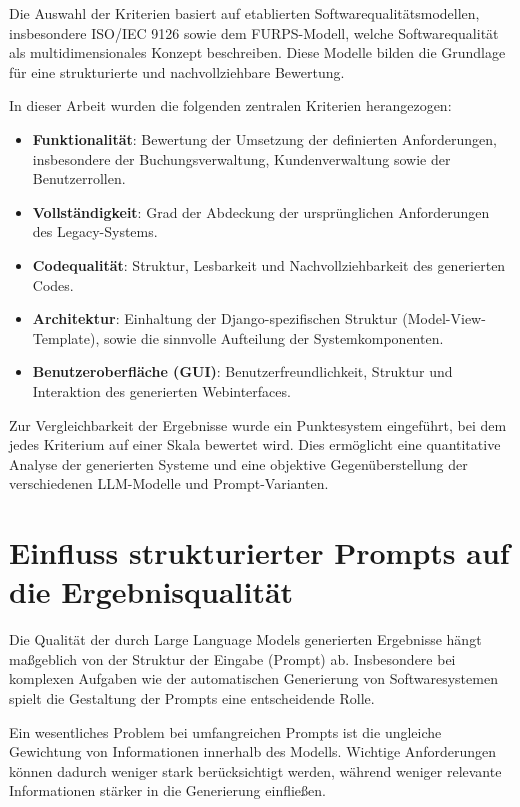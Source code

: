 Die Auswahl der Kriterien basiert auf etablierten
Softwarequalitätsmodellen, insbesondere ISO/IEC 9126 sowie
dem FURPS-Modell, welche Softwarequalität als
multidimensionales Konzept beschreiben. Diese Modelle
bilden die Grundlage für eine strukturierte und
nachvollziehbare Bewertung.

In dieser Arbeit wurden die folgenden zentralen Kriterien
herangezogen:

\begin{itemize}
    \item \textbf{Funktionalität}: Bewertung der Umsetzung
    der definierten Anforderungen, insbesondere der
    Buchungsverwaltung, Kundenverwaltung sowie der
    Benutzerrollen.

    \item \textbf{Vollständigkeit}: Grad der Abdeckung der
    ursprünglichen Anforderungen des Legacy-Systems.

    \item \textbf{Codequalität}: Struktur, Lesbarkeit und
    Nachvollziehbarkeit des generierten Codes.

    \item \textbf{Architektur}: Einhaltung der
    Django-spezifischen Struktur (Model-View-Template),
    sowie die sinnvolle Aufteilung der Systemkomponenten.

    \item \textbf{Benutzeroberfläche (GUI)}:
    Benutzerfreundlichkeit, Struktur und Interaktion
    des generierten Webinterfaces.
\end{itemize}

Zur Vergleichbarkeit der Ergebnisse wurde ein
Punktesystem eingeführt, bei dem jedes Kriterium auf
einer Skala bewertet wird. Dies ermöglicht eine
quantitative Analyse der generierten Systeme und
eine objektive Gegenüberstellung der verschiedenen
LLM-Modelle und Prompt-Varianten.

\section{Einfluss strukturierter Prompts auf die Ergebnisqualität}

Die Qualität der durch Large Language Models generierten
Ergebnisse hängt maßgeblich von der Struktur der Eingabe
(Prompt) ab. Insbesondere bei komplexen Aufgaben wie der
automatischen Generierung von Softwaresystemen spielt die
Gestaltung der Prompts eine entscheidende Rolle.

Ein wesentliches Problem bei umfangreichen Prompts ist die
ungleiche Gewichtung von Informationen innerhalb des
Modells. Wichtige Anforderungen können dadurch weniger
stark berücksichtigt werden, während weniger relevante
Informationen stärker in die Generierung einfließen.

